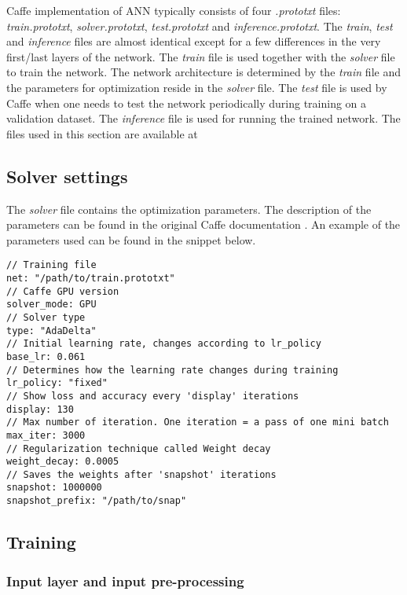 Caffe implementation of ANN typically consists of four \textit{.prototxt} files: \textit{train.prototxt}, \textit{solver.prototxt}, \textit{test.prototxt} and \textit{inference.prototxt}. The \textit{train}, \textit{test} and \textit{inference} files are almost identical except for a few differences in the very first/last layers of the network. The \textit{train} file is used together with the \textit{solver} file to train the network. The network architecture is determined by the \textit{train} file and the parameters for optimization reside in the \textit{solver} file. The \textit{test} file is used by Caffe when one needs to test the network periodically during training on a validation dataset. \cite{caffe} The \textit{inference} file is used for running the trained network. The files used in this section are available at \cite{filip_github}

\subsection{Solver settings}

The \textit{solver} file contains the optimization parameters. The description of the parameters can be found in the original Caffe documentation \cite{caffe}. An example of the parameters used can be found in the snippet below. 

\begin{lstlisting}[caption={Contents of \textit{solver.prototxt} \cite{filip_github}},captionpos=b]
// Training file
net: "/path/to/train.prototxt"	
// Caffe GPU version
solver_mode: GPU
// Solver type		
type: "AdaDelta"
// Initial learning rate, changes according to lr_policy		
base_lr: 0.061		
// Determines how the learning rate changes during training
lr_policy: "fixed"	
// Show loss and accuracy every 'display' iterations
display: 130
// Max number of iteration. One iteration = a pass of one mini batch			
max_iter: 3000	
// Regularization technique called Weight decay		
weight_decay: 0.0005
// Saves the weights after 'snapshot' iterations
snapshot: 1000000		
snapshot_prefix: "/path/to/snap" 
\end{lstlisting}

\subsection{Training}

\subsubsection{Input layer and input pre-processing}

